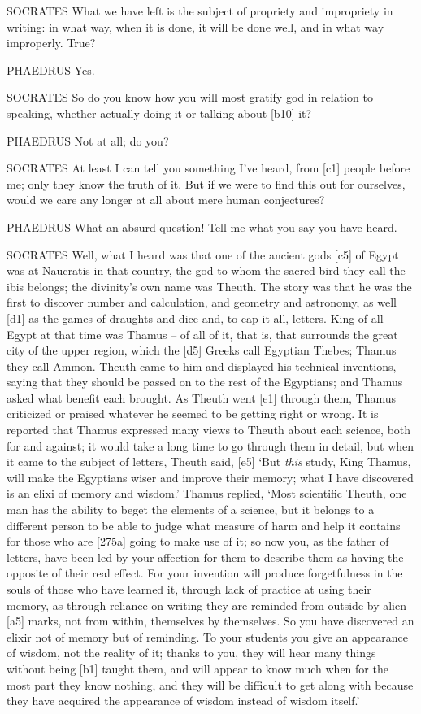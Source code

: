SOCRATES What we have left is the subject of propriety and impropriety
in writing: in what way,
when it is done, it will be done well, and in what way improperly. True?

PHAEDRUS Yes.

SOCRATES So do you know how you will most gratify god in relation to
speaking, whether actually doing it or talking about {[}b10{]} it?

PHAEDRUS Not at all; do you?

SOCRATES At least I can tell you something I've heard, from {[}c1{]}
people before me; only they know the truth of it. But if we were to find
this out for ourselves, would we care any longer at all about mere human
conjectures?

PHAEDRUS What an absurd question! Tell me what you say you have heard.

SOCRATES Well, what I heard was that one of the ancient gods {[}c5{]} of
Egypt was at Naucratis in that country, the god to whom the sacred bird
they call the ibis belongs; the divinity's own name was Theuth. The
story was that he was the first to discover number and calculation, and
geometry and astronomy, as well {[}d1{]} as the games of draughts and
dice and, to cap it all, letters. King of all Egypt at that time was
Thamus -- of all of it, that is, that surrounds the great city of the
upper region, which the {[}d5{]} Greeks call Egyptian Thebes; Thamus
they call Ammon. Theuth came to him and displayed his technical
inventions, saying that they should be passed on to the rest of the
Egyptians; and Thamus asked what benefit each brought. As Theuth went
{[}e1{]} through them, Thamus criticized or praised whatever he seemed
to be getting right or wrong. It is reported that Thamus expressed many
views to Theuth about each science, both for and against; it would take
a long time to go through them in detail, but when it came to the
subject of letters, Theuth said, {[}e5{]} ‘But {\em this} study, King
Thamus, will make the Egyptians wiser and improve their memory; what I
have discovered is an
elixi of memory and
wisdom.' Thamus replied, ‘Most scientific Theuth, one man has the
ability to beget the elements of a science, but it belongs to a
different person to be able to judge what measure of harm and help it
contains for those who are {[}275a{]} going to make use of it; so now
you, as the father of letters, have been led by your affection for them
to describe them as having the opposite of their real effect. For your
invention will produce forgetfulness in the souls of those who have
learned it, through lack of practice at using their memory, as through
reliance on writing they are reminded from outside by alien {[}a5{]}
marks, not from within, themselves by
themselves. So you have
discovered an elixir not of memory but of reminding. To your students
you give an appearance of wisdom, not the reality of it; thanks to you,
they will hear many things without being {[}b1{]} taught them, and will
appear to know much when for the most part they know nothing, and they
will be difficult to get along with because they have acquired the
appearance of wisdom instead of wisdom itself.'

